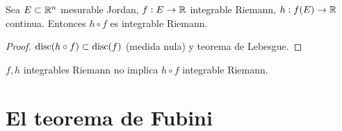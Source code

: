 \begin{prop}
    Sea $E \subset \mathbb{R}^n$ mesurable Jordan, $f : E \to \mathbb{R}$ integrable Riemann, $h : f(E) \to \mathbb{R}$ continua. Entonces $h \circ f$ es integrable Riemann.
\end{prop}

\begin{proof} 
    $\operatorname{disc}(h \circ f) \subset \operatorname{disc}(f)$ (medida nula) y teorema de Lebesgue.
\end{proof}

\begin{obs*}
    $f,h$ integrables Riemann no implica $h \circ f$ integrable Riemann.
\end{obs*}



\section{El teorema de Fubini}


